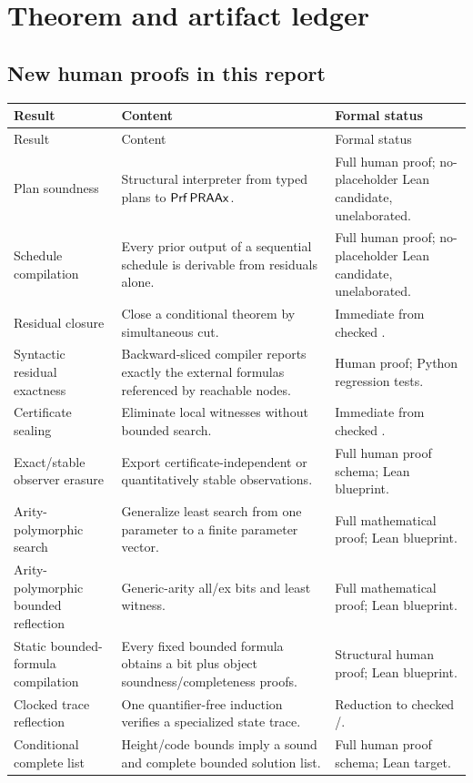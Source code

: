 \section{Theorem and artifact ledger}\label{app:ledger}

\subsection{New human proofs in this report}

\begingroup
\setlength{\tabcolsep}{3pt}
\begin{longtable}{P{0.27\textwidth}P{0.48\textwidth}P{0.20\textwidth}}
\toprule
Result & Content & Formal status \\
\midrule
\endfirsthead
\toprule
Result & Content & Formal status \\
\midrule
\endhead
Plan soundness & Structural interpreter from typed plans to \(\mathsf{Prf}\,\mathsf{PRAAx}\). & Full human proof; no-placeholder Lean candidate, unelaborated. \\
Schedule compilation & Every prior output of a sequential schedule is derivable from residuals alone. & Full human proof; no-placeholder Lean candidate, unelaborated. \\
Residual closure & Close a conditional theorem by simultaneous cut. & Immediate from checked . \\
Syntactic residual exactness & Backward-sliced compiler reports exactly the external formulas referenced by reachable nodes. & Human proof; Python regression tests. \\
Certificate sealing & Eliminate local witnesses without bounded search. & Immediate from checked . \\
Exact/stable observer erasure & Export certificate-independent or quantitatively stable observations. & Full human proof schema; Lean blueprint. \\
Arity-polymorphic search & Generalize least search from one parameter to a finite parameter vector. & Full mathematical proof; Lean blueprint. \\
Arity-polymorphic bounded reflection & Generic-arity all/ex bits and least witness. & Full mathematical proof; Lean blueprint. \\
Static bounded-formula compilation & Every fixed bounded formula obtains a bit plus object soundness/completeness proofs. & Structural human proof; Lean blueprint. \\
Clocked trace reflection & One quantifier-free induction verifies a specialized state trace. & Reduction to checked /. \\
Conditional complete list & Height/code bounds imply a sound and complete bounded solution list. & Full human proof schema; Lean target. \\
\bottomrule
\end{longtable}
\endgroup

